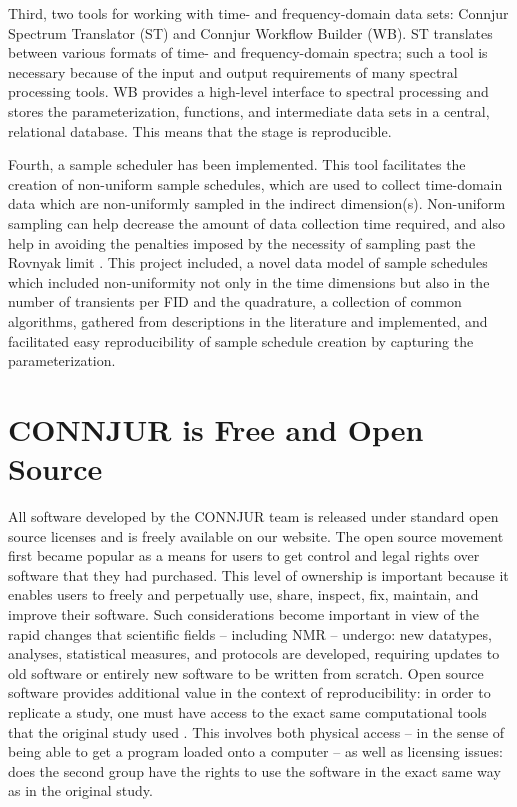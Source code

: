 Third, two tools for working with time- and frequency-domain data sets:  
Connjur Spectrum Translator (ST) and Connjur Workflow Builder (WB).  ST 
translates between various formats of time- and frequency-domain spectra; 
such a tool is necessary because of the input and output requirements of 
many spectral processing tools.  WB provides a high-level interface to 
spectral processing and stores the parameterization, functions, and 
intermediate data sets in a central, relational database.  This means 
that the stage is reproducible.

Fourth, a sample scheduler has been implemented.  This tool facilitates the 
creation of non-uniform sample schedules, which are used to collect time-domain 
data which are non-uniformly sampled in the indirect dimension(s).  Non-uniform 
sampling can help decrease the amount of data collection time required, and 
also help in avoiding the penalties imposed by the necessity of sampling past 
the Rovnyak limit \cite{rovnyak2004accelerated}.  This project included,
a novel data model of sample schedules which included non-uniformity not 
only in the time dimensions but also in the number of transients per FID and 
the quadrature, 
a collection of common algorithms, gathered from descriptions in the 
literature and implemented,
and facilitated easy reproducibility of sample schedule creation by capturing
the parameterization.


\section{CONNJUR is Free and Open Source}
All software developed by the CONNJUR team is released under standard open 
source licenses and is freely available on our website.  The open source 
movement first became popular as a means for users to get control and legal 
rights over software that they had purchased.  This level of ownership is 
important because it enables users to freely and perpetually use, share, 
inspect, fix, maintain, and improve their software.  Such considerations 
become important in view of the rapid changes that scientific fields -- 
including NMR -- undergo: new datatypes, analyses, statistical measures, 
and protocols are developed, requiring updates to old software or entirely 
new software to be written from scratch.  Open source software provides 
additional value in the context of reproducibility: in order to replicate a
study, one must have access to the exact same computational tools that the 
original study used \cite{ince2012open}.  
This involves both physical access -- in the sense of 
being able to get a program loaded onto a computer -- as well as licensing 
issues: does the second group have the rights to use the software in the 
exact same way as in the original study.

